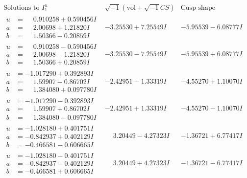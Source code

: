 \documentclass[1p]{elsarticle_modified}
\theoremstyle{definition}
\newcommand{\I}{\sqrt{-1}}
\begin{document}
$$\begin{array}{c|c|c}  
\text{Solutions to }I^u_{1}& \I (\text{vol} + \sqrt{-1}CS) & \text{Cusp shape}\\
 \hline 
\begin{aligned}
u &= \phantom{-}0.910258 + 0.590456 I \\
a &= \phantom{-}2.00698 + 1.21820 I \\
b &= \phantom{-}1.50366 - 0.20859 I\end{aligned}
 & -3.25530 + 7.25549 I & -5.95539 - 6.08777 I \\ \hline\begin{aligned}
u &= \phantom{-}0.910258 - 0.590456 I \\
a &= \phantom{-}2.00698 - 1.21820 I \\
b &= \phantom{-}1.50366 + 0.20859 I\end{aligned}
 & -3.25530 - 7.25549 I & -5.95539 + 6.08777 I \\ \hline\begin{aligned}
u &= -1.017290 + 0.392893 I \\
a &= \phantom{-}1.59907 - 0.86702 I \\
b &= \phantom{-}1.384080 + 0.097780 I\end{aligned}
 & -2.42951 - 1.33319 I & -4.55270 + 1.10070 I \\ \hline\begin{aligned}
u &= -1.017290 - 0.392893 I \\
a &= \phantom{-}1.59907 + 0.86702 I \\
b &= \phantom{-}1.384080 - 0.097780 I\end{aligned}
 & -2.42951 + 1.33319 I & -4.55270 - 1.10070 I \\ \hline\begin{aligned}
u &= -1.028180 + 0.401751 I \\
a &= -0.842937 + 0.402129 I \\
b &= -0.466581 - 0.606665 I\end{aligned}
 & \phantom{-}3.20449 - 4.27323 I & -1.36721 + 6.77417 I \\ \hline\begin{aligned}
u &= -1.028180 - 0.401751 I \\
a &= -0.842937 - 0.402129 I \\
b &= -0.466581 + 0.606665 I\end{aligned}
 & \phantom{-}3.20449 + 4.27323 I & -1.36721 - 6.77417 I \\ \hline\begin{aligned}

\end{aligned}
\end{array}$$
\end{document}
